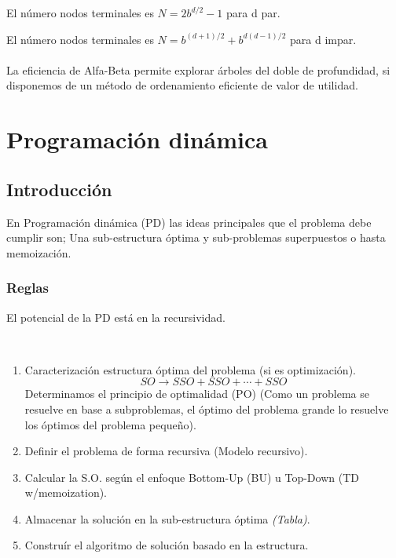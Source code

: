 \documentclass[tikz,11pt,fleqn]{book} %
\begin{document}
El número nodos terminales es $N=2b^{d/2} - 1$ para d par.

El número nodos terminales es $N=b^{(d+1)/2}+b^{d(d-1)/2}$ para d impar.
\\\\
La eficiencia de Alfa-Beta permite explorar árboles del doble de profundidad, si disponemos de un método de ordenamiento eficiente de valor de utilidad.

\chapter{Programación dinámica}
\section{Introducción}

En Programación dinámica (PD) las ideas principales que el problema debe cumplir son; Una sub-estructura óptima y sub-problemas superpuestos o hasta memoización.

\subsection{Reglas}
El potencial de la PD está en la recursividad.
\begin{definition}~
    \begin{enumerate}
        \item Caracterización estructura óptima del problema (si es optimización).
        $$ SO\to SSO+SSO+\cdots+SSO $$
        Determinamos el principio de optimalidad (PO) (Como un problema se resuelve en base a subproblemas, el óptimo del problema grande lo resuelve los óptimos del problema pequeño).
        \item  Definir el problema de forma recursiva (Modelo recursivo).
        \item  Calcular la S.O. según el enfoque Bottom-Up (BU) u Top-Down (TD w/memoization).
        \item  Almacenar la solución en la sub-estructura óptima \textit{(Tabla)}.
        \item  Construír el algoritmo de solución basado en la estructura.
    \end{enumerate}
\end{definition}
\end{document}
